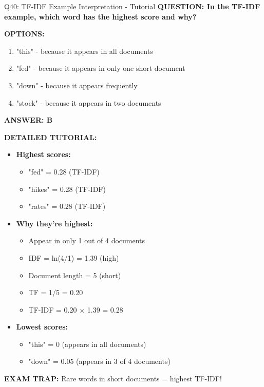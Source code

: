 \documentclass[8pt]{beamer}
\begin{document}
	\begin{frame}{Q40: TF-IDF Example Interpretation - Tutorial}
		\fontsize{6.5}{7.5}\selectfont
		\textbf{QUESTION: In the TF-IDF example, which word has the highest score and why?}
		
		\vspace{0.1cm}
		\textbf{OPTIONS:}
		\begin{enumerate}
			\item "this" - because it appears in all documents
			\item "fed" - because it appears in only one short document
			\item "down" - because it appears frequently
			\item "stock" - because it appears in two documents
		\end{enumerate}
		
		\vspace{0.1cm}
		\textcolor{myblue}{\textbf{ANSWER: B}}
		
		\vspace{0.1cm}
		\textbf{DETAILED TUTORIAL:}
		\begin{itemize}
			\item \textbf{Highest scores:}
			\begin{itemize}
				\item "fed" = 0.28 (TF-IDF)
				\item "hikes" = 0.28 (TF-IDF)
				\item "rates" = 0.28 (TF-IDF)
			\end{itemize}
			\item \textbf{Why they're highest:}
			\begin{itemize}
				\item Appear in only 1 out of 4 documents
				\item IDF = ln(4/1) = 1.39 (high)
				\item Document length = 5 (short)
				\item TF = 1/5 = 0.20
				\item TF-IDF = 0.20 $\times$ 1.39 = 0.28
			\end{itemize}
			\item \textbf{Lowest scores:}
			\begin{itemize}
				\item "this" = 0 (appears in all documents)
				\item "down" = 0.05 (appears in 3 of 4 documents)
			\end{itemize}
		\end{itemize}
		
		\textcolor{myred}{\textbf{EXAM TRAP:}} Rare words in short documents = \textcolor{myblue}{highest TF-IDF}!
	\end{frame}
	
\end{document}
